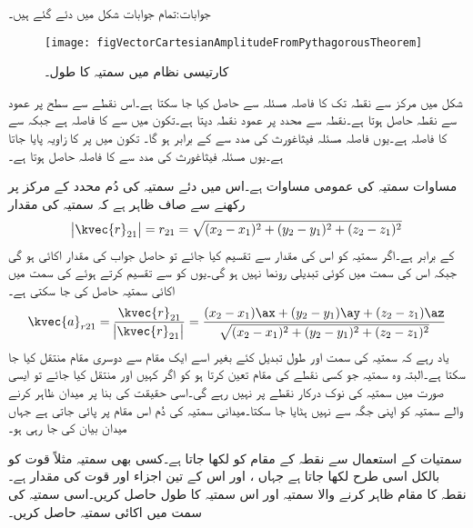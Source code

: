 جوابات:تمام جوابات شکل میں دئے گئے ہیں۔
\begin{figure}
\centering
\texttt{[image: figVectorCartesianAmplitudeFromPythagorousTheorem]}
\caption{کارتیسی نظام میں سمتیہ کا طول۔}
\label{شکل_سمتیہ_کارتیسی_سمتیہ_طول}
\end{figure}

شکل  میں مرکز سے نقطہ  تک کا فاصلہ  مسئلہ  سے حاصل کیا جا سکتا ہے۔اس نقطے سے  سطح پر عمود سے نقطہ  حاصل ہوتا ہے۔نقطہ  سے  محدد پر عمود نقطہ  دیتا ہے۔تکون  میں  سے  کا فاصلہ  ہے جبکہ  سے  کا فاصلہ  ہے۔یوں فاصلہ  مسئلہ فیثاغورث کی مدد سے   کے برابر ہو گا۔ تکون  میں  پر  کا زاویہ پایا جاتا ہے۔یوں مسئلہ فیثاغورث کی مدد سے  کا فاصلہ  حاصل ہوتا ہے۔

مساوات  سمتیہ کی عمومی مساوات ہے۔اس میں دئے سمتیہ  کی دُم محدد کے مرکز پر رکھنے سے صاف ظاہر ہے کہ سمتیہ کی مقدار
\begin{align}
\abs{\kvec{r}_{21}}=r_{21}=\sqrt{(x_2-x_1)^2+(y_2-y_1)^2+(z_2-z_1)^2}
\end{align}
کے برابر ہے۔اگر سمتیہ کو اس کی مقدار سے تقسیم کیا جائے تو حاصل جواب کی مقدار اکائی ہو گی جبکہ اس کی سمت میں کوئی تبدیلی رونما نہیں ہو گی۔یوں   کو  سے تقسیم کرتے ہوئے  کی سمت میں اکائی سمتیہ  حاصل کی جا سکتی ہے۔
\begin{align}
\kvec{a}_{r21}=\frac{\kvec{r}_{21}}{\abs{\kvec{r}_{21}}}=\frac{(x_2-x_1) \ax+(y_2-y_1)\ay+(z_2-z_1)\az}{\sqrt{(x_2-x_1)^2+(y_2-y_1)^2+(z_2-z_1)^2}}
\end{align}
یاد رہے کہ سمتیہ کی سمت اور طول تبدیل کئے بغیر اسے ایک مقام سے دوسری مقام منتقل کیا جا سکتا ہے۔البتہ وہ سمتیہ جو کسی نقطے کی مقام تعین کرتا ہو کو اگر کہیں اور منتقل کیا جائے تو ایسی صورت میں  سمتیہ کی نوک درکار نقطے پر نہیں رہے گی۔اسی حقیقت کی بنا پر میدان ظاہر کرنے والے سمتیہ کو اپنی جگہ سے نہیں ہٹایا جا سکتا۔میدانی سمتیہ کی دُم اس مقام پر پائی جاتی ہے جہاں میدان بیان کی جا رہی ہو۔  

سمتیات کے استعمال سے نقطہ  کے مقام کو  لکھا جاتا ہے۔کسی بھی سمتیہ مثلاً قوت  کو بالکل اسی طرح   لکھا جاتا ہے جہاں ،  اور  اس کے تین اجزاء اور
   قوت کی مقدار ہے۔
نقطہ   کا مقام ظاہر کرنے والا سمتیہ اور اس سمتیہ کا طول حاصل کریں۔اسی سمتیہ کی سمت میں اکائی سمتیہ حاصل کریں۔

